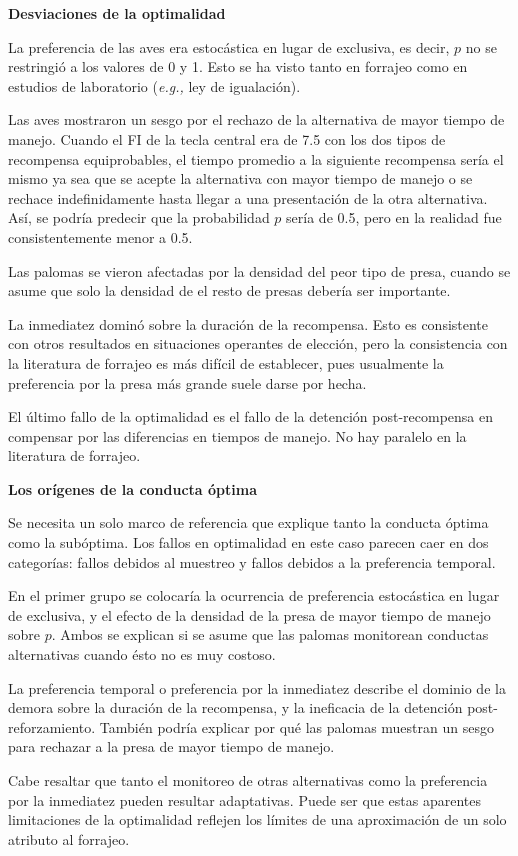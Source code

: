 \documentclass[a4paper,12pt]{article}
\begin{document}
{\bfseries Desviaciones de la optimalidad}

La preferencia de las aves era estocástica en lugar de exclusiva, es decir, $p$ no se restringió a los valores de 0 y 1. Esto se ha visto tanto en forrajeo como en estudios de laboratorio ({\itshape e.g.,} ley de igualación).

Las aves mostraron un sesgo por el rechazo de la alternativa de mayor tiempo de manejo. Cuando el FI de la tecla central era de 7.5 con los dos tipos de recompensa equiprobables, el tiempo promedio a la siguiente recompensa sería el mismo ya sea que se acepte la alternativa con mayor tiempo de manejo o se rechace indefinidamente hasta llegar a una presentación de la otra alternativa. Así, se podría predecir que la probabilidad $p$ sería de 0.5, pero en la realidad fue consistentemente menor a 0.5.

Las palomas se vieron afectadas por la densidad del peor tipo de presa, cuando se asume que solo la densidad de el resto de presas debería ser importante.

La inmediatez dominó sobre la duración de la recompensa. Esto es consistente con otros resultados en situaciones operantes de elección, pero la consistencia con la literatura de forrajeo es más difícil de establecer, pues usualmente la preferencia por la presa más grande suele darse por hecha.

El último fallo de la optimalidad es el fallo de la detención post-recompensa en compensar por las diferencias en tiempos de manejo. No hay paralelo en la literatura de forrajeo.

{\bfseries Los orígenes de la conducta óptima}

Se necesita un solo marco de referencia que explique tanto la conducta óptima como la subóptima. Los fallos en optimalidad en este caso parecen caer en dos categorías: fallos debidos al muestreo y fallos debidos a la preferencia temporal.

En el primer grupo se colocaría la ocurrencia de preferencia estocástica en lugar de exclusiva, y el efecto de la densidad de la presa de mayor tiempo de manejo sobre $p$. Ambos se explican si se asume que las palomas monitorean conductas alternativas cuando ésto no es muy costoso.

La preferencia temporal o preferencia por la inmediatez describe el dominio de la demora sobre la duración de la recompensa, y la ineficacia de la detención post-reforzamiento. También podría explicar por qué las palomas muestran un sesgo para rechazar a la presa de mayor tiempo de manejo.

Cabe resaltar que tanto el monitoreo de otras alternativas como la preferencia por la inmediatez pueden resultar adaptativas. Puede ser que estas aparentes limitaciones de la optimalidad reflejen los límites de una aproximación de un solo atributo al forrajeo. 
\end{document}

